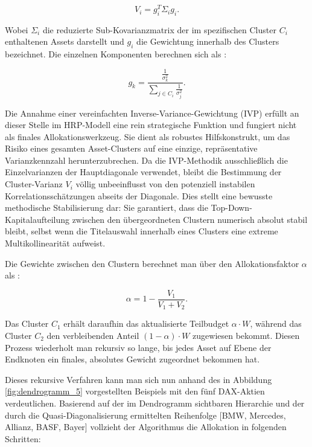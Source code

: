 \documentclass[parskip=half]{scrartcl}
\begin{document}
	\begin{equation}
		V_i = g_i^T \Sigma_i g_i . \label{eq:ivp}
	\end{equation}
	
	Wobei $\Sigma_i$ die reduzierte Sub-Kovarianzmatrix der im spezifischen Cluster $C_i$ enthaltenen Assets darstellt und $g_i$ die Gewichtung innerhalb des Clusters bezeichnet. Die einzelnen Komponenten berechnen sich als \parencite[8]{Lopez2}:
	
	\begin{equation}
		g_k = \frac{\frac{1}{\sigma_k^2}}{\sum_{j \in C_i} \frac{1}{\sigma_j^2}} . \label{eq:ivp_weights}
	\end{equation}
	
	Die Annahme einer vereinfachten Inverse-Variance-Gewichtung (IVP) erfüllt an dieser Stelle im HRP-Modell eine rein strategische Funktion und fungiert nicht als finales Allokationswerkzeug. Sie dient als robustes Hilfskonstrukt, um das Risiko eines gesamten Asset-Clusters auf eine einzige, repräsentative Varianzkennzahl herunterzubrechen. Da die IVP-Methodik ausschließlich die Einzelvarianzen der Hauptdiagonale verwendet, bleibt die Bestimmung der Cluster-Varianz $V_i$ völlig unbeeinflusst von den potenziell instabilen Korrelationsschätzungen abseits der Diagonale. Dies stellt eine bewusste methodische Stabilisierung dar: Sie garantiert, dass die Top-Down-Kapitalaufteilung zwischen den übergeordneten Clustern numerisch absolut stabil bleibt, selbst wenn die Titelauswahl innerhalb eines Clusters eine extreme Multikollinearität aufweist.
	
	Die Gewichte zwischen den Clustern berechnet man über den Allokationsfaktor $\alpha$ als \parencite[230]{Lopez}:
	
	\begin{equation}
		\alpha = 1 - \frac{V_1}{V_1 + V_2} . \label{eq:alpha_bisection}
	\end{equation}
	
	Das Cluster $C_1$ erhält daraufhin das aktualisierte Teilbudget $\alpha \cdot W$, während das Cluster $C_2$ den verbleibenden Anteil $(1 - \alpha) \cdot W$ zugewiesen bekommt. Diesen Prozess wiederholt man rekursiv so lange, bis jedes Asset auf Ebene der Endknoten ein finales, absolutes Gewicht zugeordnet bekommen hat.
	
	Dieses rekursive Verfahren kann man sich nun anhand des in Abbildung \ref{fig:dendrogramm_5} vorgestellten Beispiels mit den fünf DAX-Aktien verdeutlichen. Basierend auf der im Dendrogramm sichtbaren Hierarchie und der durch die Quasi-Diagonalisierung ermittelten Reihenfolge [BMW, Mercedes, Allianz, BASF, Bayer] vollzieht der Algorithmus die Allokation in folgenden Schritten:
	
\end{document}
